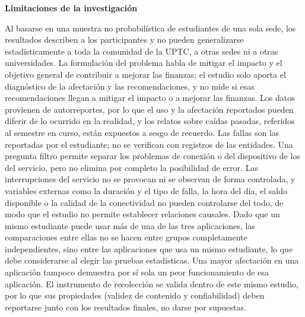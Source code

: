 \noindent\textbf{Limitaciones de la investigación}
\par\vspace{0.6em}

\noindent Al basarse en una muestra no probabilística de estudiantes de una sola sede, los resultados describen a los participantes y no pueden generalizarse estadísticamente a toda la comunidad de la UPTC, a otras sedes ni a otras universidades. La formulación del problema habla de mitigar el impacto y el objetivo general de contribuir a mejorar las finanzas; el estudio solo aporta el diagnóstico de la afectación y las recomendaciones, y no mide si esas recomendaciones llegan a mitigar el impacto o a mejorar las finanzas. Los datos provienen de autorreportes, por lo que el uso y la afectación reportados pueden diferir de lo ocurrido en la realidad, y los relatos sobre caídas pasadas, referidos al semestre en curso, están expuestos a sesgo de recuerdo. Las fallas son las reportadas por el estudiante; no se verifican con registros de las entidades. Una pregunta filtro permite separar los problemas de conexión o del dispositivo de los del servicio, pero no elimina por completo la posibilidad de error. Las interrupciones del servicio no se provocan ni se observan de forma controlada, y variables externas como la duración y el tipo de falla, la hora del día, el saldo disponible o la calidad de la conectividad no pueden controlarse del todo, de modo que el estudio no permite establecer relaciones causales. Dado que un mismo estudiante puede usar más de una de las tres aplicaciones, las comparaciones entre ellas no se hacen entre grupos completamente independientes, sino entre las aplicaciones que usa un mismo estudiante, lo que debe considerarse al elegir las pruebas estadísticas. Una mayor afectación en una aplicación tampoco demuestra por sí sola un peor funcionamiento de esa aplicación. El instrumento de recolección se valida dentro de este mismo estudio, por lo que sus propiedades (validez de contenido y confiabilidad) deben reportarse junto con los resultados finales, no darse por supuestas.
\par\vspace{0.8em}
